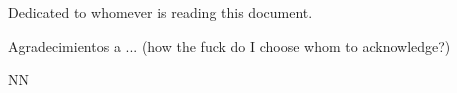 
\begin{dedicatory}
    Dedicated to whomever is reading this document.
  \end{dedicatory}
  
  \begin{acknowledgment}
    Agradecimientos a ... (how the fuck do I choose whom to acknowledge?)
  \end{acknowledgment}
  NN